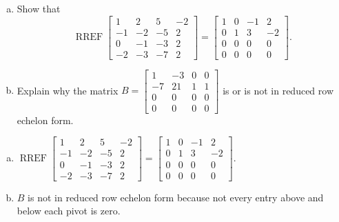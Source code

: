 
\begin{exerciseStatement}

\begin{enumerate}[(a)]
\item Show that \[\operatorname{RREF} \left[\begin{array}{cccc}
1 & 2 & 5 & -2 \\
-1 & -2 & -5 & 2 \\
0 & -1 & -3 & 2 \\
-2 & -3 & -7 & 2
\end{array}\right] = \left[\begin{array}{cccc}
1 & 0 & -1 & 2 \\
0 & 1 & 3 & -2 \\
0 & 0 & 0 & 0 \\
0 & 0 & 0 & 0
\end{array}\right] .\]
\item Explain why the matrix \(B= \left[\begin{array}{cccc}
1 & -3 & 0 & 0 \\
-7 & 21 & 1 & 1 \\
0 & 0 & 0 & 0 \\
0 & 0 & 0 & 0
\end{array}\right] \) is or is not in reduced row echelon form.
\end{enumerate}
    
\end{exerciseStatement}
    
\begin{exerciseAnswer} 

\begin{enumerate}[(a)]
\item \(\operatorname{RREF} \left[\begin{array}{cccc}
1 & 2 & 5 & -2 \\
-1 & -2 & -5 & 2 \\
0 & -1 & -3 & 2 \\
-2 & -3 & -7 & 2
\end{array}\right] = \left[\begin{array}{cccc}
1 & 0 & -1 & 2 \\
0 & 1 & 3 & -2 \\
0 & 0 & 0 & 0 \\
0 & 0 & 0 & 0
\end{array}\right] .\)
\item \(B\) is not in reduced row echelon form because not every entry above and below each pivot is zero. 
\end{enumerate}
    
\end{exerciseAnswer}
    
